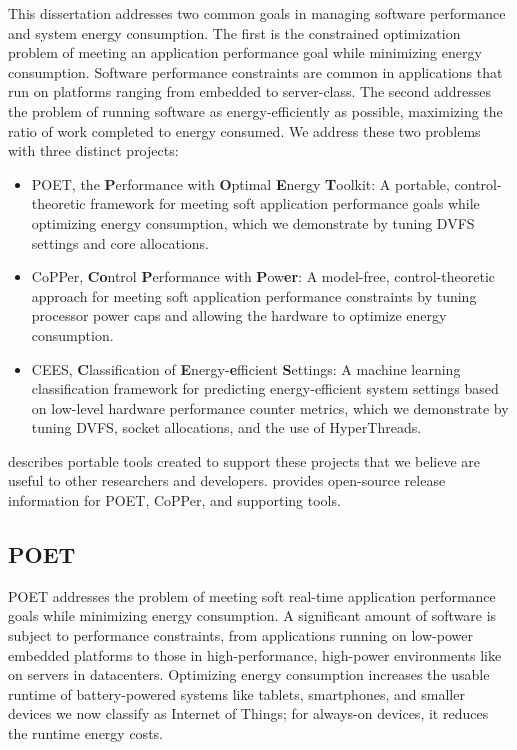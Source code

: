 This dissertation addresses two common goals in managing software performance and system energy consumption.
The first is the constrained optimization problem of meeting an application performance goal while minimizing energy consumption.
Software performance constraints are common in applications that run on platforms ranging from embedded to server-class.
The second addresses the problem of running software as energy-efficiently as possible, \ie maximizing the ratio of work completed to energy consumed.
We address these two problems with three distinct projects:
\begin{itemize}
\item POET, the \textbf{P}erformance with \textbf{O}ptimal \textbf{E}nergy \textbf{T}oolkit: A portable, control-theoretic framework for meeting soft application performance goals while optimizing energy consumption, which we demonstrate by tuning DVFS settings and core allocations.
\item CoPPer, \textbf{Co}ntrol \textbf{P}erformance with \textbf{P}ow\textbf{er}: A model-free, control-theoretic approach for meeting soft application performance constraints by tuning processor power caps and allowing the hardware to optimize energy consumption.
\item CEES, \textbf{C}lassification of \textbf{E}nergy-\textbf{e}fficient \textbf{S}ettings: A machine learning classification framework for predicting energy-efficient system settings based on low-level hardware performance counter metrics, which we demonstrate by tuning DVFS, socket allocations, and the use of HyperThreads.
\end{itemize}
 describes portable tools created to support these projects that we believe are useful to other researchers and developers.
 provides open-source release information for POET, CoPPer, and supporting tools.


\subsection{POET}

POET addresses the problem of meeting soft real-time application performance goals while minimizing energy consumption.
A significant amount of software is subject to performance constraints, from applications running on low-power embedded platforms to those in high-performance, high-power environments like on servers in datacenters.
Optimizing energy consumption increases the usable runtime of battery-powered systems like tablets, smartphones, and smaller devices we now classify as Internet of Things; for always-on devices, it reduces the runtime energy costs.

